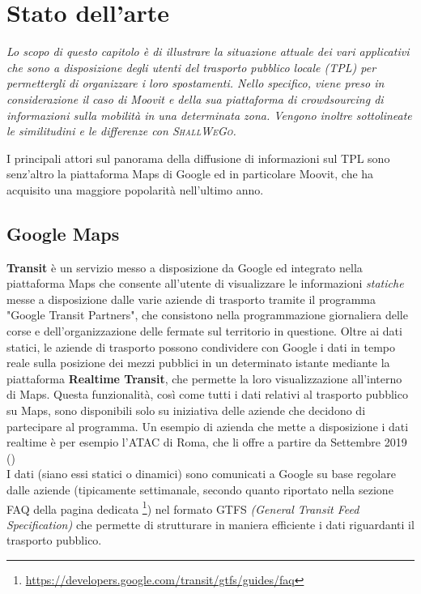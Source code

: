 \chapter{Stato dell'arte} %
%

\begin{citazione}
    \textit{Lo scopo di questo capitolo è di illustrare la situazione attuale dei vari applicativi che sono a disposizione degli utenti del trasporto pubblico locale (TPL) per permettergli di organizzare i loro spostamenti. Nello specifico, viene preso in considerazione il caso di Moovit e della sua piattaforma di crowdsourcing di informazioni sulla mobilità in una determinata zona. Vengono inoltre sottolineate le similitudini e le differenze con \textsc{ShallWeGo}.}
\end{citazione}

\newpage

I principali attori sul panorama della diffusione di informazioni sul TPL sono senz'altro la piattaforma Maps di Google ed in particolare Moovit, che ha acquisito una maggiore popolarità nell'ultimo anno.

\section{Google Maps}
    \textbf{Transit} è un servizio messo a disposizione da Google ed integrato nella piattaforma Maps che consente all'utente di visualizzare le informazioni \textit{statiche} messe a disposizione dalle varie aziende di trasporto tramite il programma "Google Transit Partners", che consistono nella programmazione giornaliera delle corse e dell'organizzazione delle fermate sul territorio in questione. Oltre ai dati statici, le aziende di trasporto possono condividere con Google i dati in tempo reale sulla posizione dei mezzi pubblici in un determinato istante mediante la piattaforma \textbf{Realtime Transit}, che permette la loro visualizzazione all'interno di Maps. Questa funzionalità, così come tutti i dati relativi al trasporto pubblico su Maps, sono disponibili solo su iniziativa delle aziende che decidono di partecipare al programma. Un esempio di azienda che mette a disposizione i dati realtime è per esempio l'ATAC di Roma, che li offre a partire da Settembre 2019 (\cite{atactransit})  \\
    I dati (siano essi statici o dinamici) sono comunicati a Google su base regolare dalle aziende (tipicamente settimanale, secondo quanto riportato nella sezione FAQ della pagina dedicata \footnote[2]{\url{https://developers.google.com/transit/gtfs/guides/faq}}) nel formato GTFS \textit{(General Transit Feed Specification)} che permette di strutturare in maniera efficiente i dati riguardanti il trasporto pubblico.

